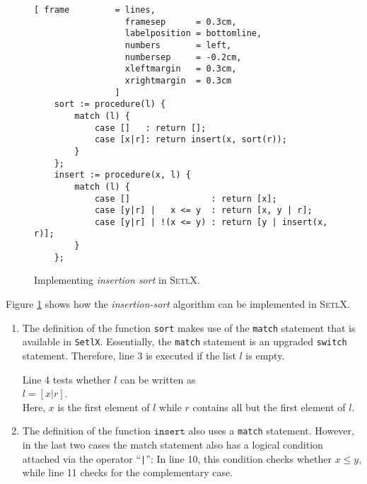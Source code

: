 \begin{figure}[!ht]
  \centering
\begin{Verbatim}[ frame         = lines, 
                  framesep      = 0.3cm, 
                  labelposition = bottomline,
                  numbers       = left,
                  numbersep     = -0.2cm,
                  xleftmargin   = 0.3cm,
                  xrightmargin  = 0.3cm
                ]
    sort := procedure(l) {
        match (l) {
            case []   : return [];
            case [x|r]: return insert(x, sort(r));
        }
    };
    insert := procedure(x, l) {
        match (l) {
            case []                : return [x];
            case [y|r] |   x <= y  : return [x, y | r];
            case [y|r] | !(x <= y) : return [y | insert(x, r)];
        }
    };
\end{Verbatim}
\vspace*{-0.3cm}
  \caption{Implementing \emph{insertion sort} in \textsc{SetlX}.}
  \label{fig:insertion-sort.stlx}
\end{figure} 

\noindent
Figure \ref{fig:insertion-sort.stlx} shows how the \emph{insertion-sort} algorithm can be implemented 
in \textsc{SetlX}.
\begin{enumerate}
\item The definition of the function \texttt{sort} makes use of the \texttt{match} statement
      that is available in \texttt{SetlX}.  Essentially, the \texttt{match} statement is an upgraded
      \texttt{switch} statement.  Therefore, line 3 is executed if the list $l$ is empty.

      Line 4 tests whether $l$ can be written as  
      \\[0.2cm]
      \hspace*{1.3cm}
      $l = [x | r]$.
      \\[0.2cm]
      Here, $x$ is the first element of $l$ while $r$ contains all but the first element of $l$.  
\item The definition of the function $\mathtt{insert}$ also uses a 
      \texttt{match} statement.  However, in the last two cases the match statement
      also has a logical condition attached via the operator ``\texttt{|}'':
      In line 10, this condition checks whether $x \leq y$, while line 11 checks for the
      complementary case.
\end{enumerate}

